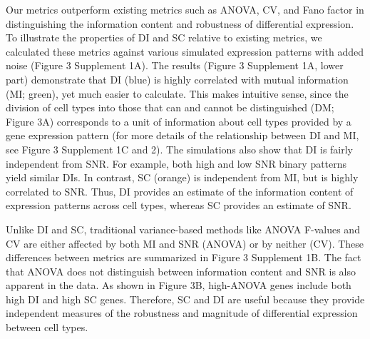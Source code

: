 Our metrics outperform existing metrics such as ANOVA, CV, and Fano factor in distinguishing the information content and robustness of differential expression. To illustrate the properties of DI and SC relative to existing metrics, we calculated these metrics against various simulated expression patterns with added noise (Figure 3 Supplement 1A). The results (Figure 3 Supplement 1A, lower part) demonstrate that DI (blue) is highly correlated with mutual information (MI; green), yet much easier to calculate. This makes intuitive sense, since the division of cell types into those that can and cannot be distinguished (DM; Figure 3A) corresponds to a unit of information about cell types provided by a gene expression pattern (for more details of the relationship between DI and MI, see Figure 3 Supplement 1C and 2). 
The simulations also show that DI is fairly independent from SNR. For example, both high and low SNR binary patterns yield similar DIs. In contrast, SC (orange) is independent from MI, but is highly correlated to SNR. Thus, DI provides an estimate of the information content of expression patterns across cell types, whereas SC provides an estimate of SNR.

Unlike DI and SC, traditional variance-based methods like ANOVA F-values and CV are either affected by both MI and SNR (ANOVA) or by neither (CV). These differences between metrics are summarized in Figure 3 Supplement 1B. The fact that ANOVA does not distinguish between information content and SNR is also apparent in the data. As shown in Figure 3B, high-ANOVA genes include both high DI and high SC genes. Therefore, SC and DI are useful because they provide independent measures of the robustness and magnitude of differential expression between cell types.

